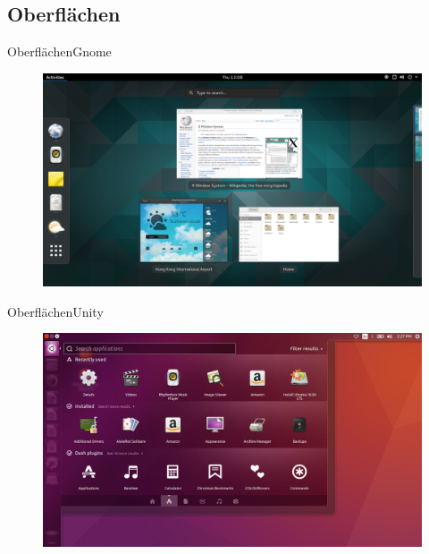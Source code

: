 \subsection{Oberflächen}
\begin{frame}{Oberflächen}{Gnome}
\begin{figure}
 \includegraphics[height=0.6\textheight]{resources/1200px-GNOME_Shell.png}
 \end{figure}

\end{frame}
\begin{frame}{Oberflächen}{Unity}

\begin{figure}
 \includegraphics[height=0.6\textheight]{resources/1200px-App_Lens_on_Ubuntu.png}
 \end{figure}
\end{frame}

